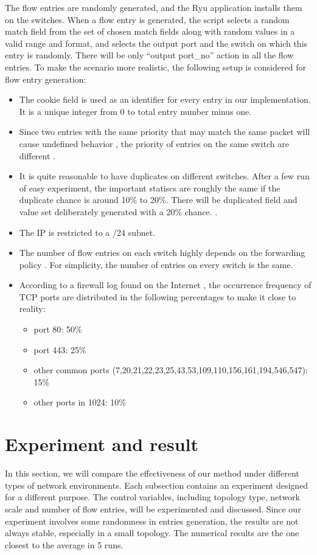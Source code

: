 The flow entries are randomly generated, and the Ryu application installs them on the switches. When a flow entry is generated, the script selects a random match field from the set of chosen match fields along with random values in a valid range and format, and selects the output port and the switch on which this entry is randomly. There will be only ``output port\_no'' action in all the flow entries. To make the scenario more realistic, the following setup is considered for flow entry generation:

\begin{itemize}
\item 
The cookie field is used as an identifier for every entry in our implementation. It is a unique integer from 0 to total entry number minus one.\sout{}
\item
Since two entries with the same priority that may match the same packet will cause undefined behavior \cite{OF_SPEC}, the priority of entries on the same switch are different .
\item
It is quite reasonable to have duplicates on different switches. After a few run of easy experiment, the important statiscs are roughly the same if the duplicate chance is around 10\% to 20\%. There will be duplicated field and value set deliberately generated with a 20\% chance.
\sout{}. 
\item
The IP is restricted to a /24 subnet.
\item
The number of flow entries on each switch highly depends on the forwarding policy \cite{MPFHMRSV09}. For simplicity, the number of entries on every switch is the same. 
\item
According to a firewall log found on the Internet \cite{PORT_FREQ}, the occurrence frequency of TCP ports are distributed in the following percentages to make it close to reality:
\begin{itemize}
\item
port 80: 50\%
\item
port 443: 25\%
\item
other common ports (7,20,21,22,23,25,43,53,109,110,156,161,194,546,547): 15\%
\item
other ports in 1024: 10\%
\end{itemize}
\end{itemize}

\section{Experiment and result}
In this section, we will compare the effectiveness of our method under different types of network environments. Each subsection contains an experiment designed for a different purpose. The control variables, including topology type, network scale and number of flow entries, will be experimented and discussed. Since our experiment involves some randomness in entries generation, the results are not always stable, especially in a small topology. The numerical results are the one closest to the average in 5 runs.

